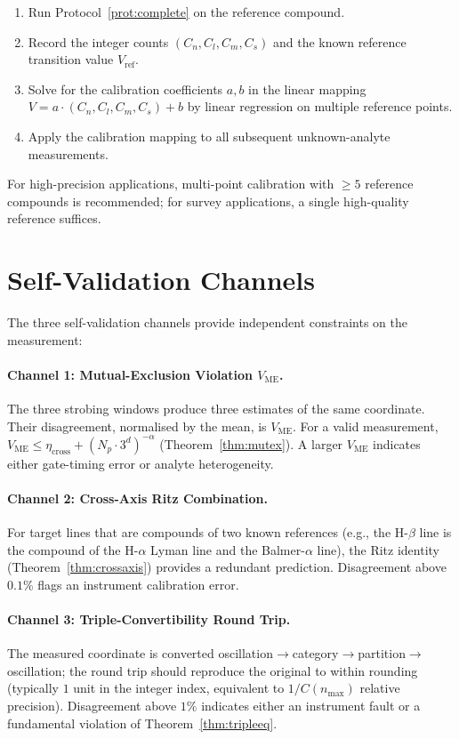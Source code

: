 \documentclass[twocolumn,11pt,a4paper]{article}
\theoremstyle{thmstyle}
\theoremstyle{axiomstyle}
\theoremstyle{definition}
\theoremstyle{remark}
\newcommand{\Vme}{V_{\mathrm{ME}}}
\begin{document}
\begin{enumerate}[nosep]
\item Run Protocol~\ref{prot:complete} on the reference compound.
\item Record the integer counts $(C_{n},C_{l},C_{m},C_{s})$ and the known reference transition value $V_{\mathrm{ref}}$.
\item Solve for the calibration coefficients $a, b$ in the linear mapping $V=a\cdot(C_{n},C_{l},C_{m},C_{s})+b$ by linear regression on multiple reference points.
\item Apply the calibration mapping to all subsequent unknown-analyte measurements.
\end{enumerate}

For high-precision applications, multi-point calibration with $\geq 5$ reference compounds is recommended; for survey applications, a single high-quality reference suffices.

\section{Self-Validation Channels}
\label{sec:methods_selfvalid}

The three self-validation channels provide independent constraints on the measurement:

\paragraph{Channel 1: Mutual-Exclusion Violation $\Vme$.} The three strobing windows produce three estimates of the same coordinate. Their disagreement, normalised by the mean, is $\Vme$. For a valid measurement, $\Vme\leq\eta_{\mathrm{cross}}+(N_{p}\cdot 3^{d})^{-\alpha}$ (Theorem~\ref{thm:mutex}). A larger $\Vme$ indicates either gate-timing error or analyte heterogeneity.

\paragraph{Channel 2: Cross-Axis Ritz Combination.} For target lines that are compounds of two known references (e.g., the H-$\beta$ line is the compound of the H-$\alpha$ Lyman line and the Balmer-$\alpha$ line), the Ritz identity (Theorem~\ref{thm:crossaxis}) provides a redundant prediction. Disagreement above $0.1\%$ flags an instrument calibration error.

\paragraph{Channel 3: Triple-Convertibility Round Trip.} The measured coordinate is converted oscillation$\to$category$\to$partition$\to$oscillation; the round trip should reproduce the original to within rounding (typically $1$ unit in the integer index, equivalent to $1/C(n_{\mathrm{max}})$ relative precision). Disagreement above $1\%$ indicates either an instrument fault or a fundamental violation of Theorem~\ref{thm:tripleeq}.
\end{document}
